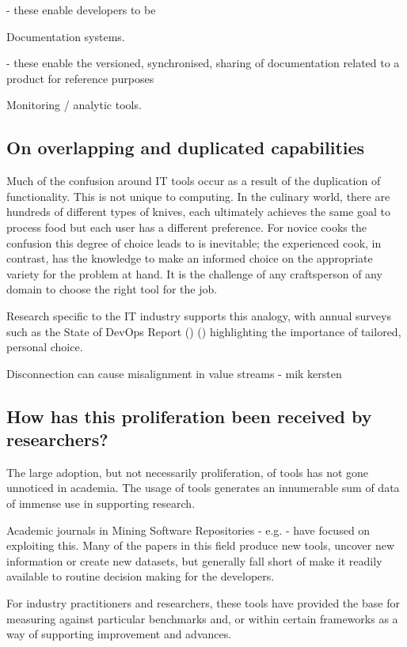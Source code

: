 - these enable developers to be 

Documentation systems.

- these enable the versioned, synchronised, sharing of documentation related to a product for reference purposes

Monitoring / analytic tools.

\subsection{On overlapping and duplicated capabilities}

Much of the confusion around IT tools occur as a result of the duplication of functionality. This is not unique to computing. In the culinary world, there are hundreds of different types of knives, each ultimately achieves the same goal to process food but each user has a different preference. For novice cooks the confusion this degree of choice leads to is inevitable; the experienced cook, in contrast, has the knowledge to make an informed choice on the appropriate variety for the problem at hand. It is the challenge of any craftsperson of any domain to choose the right tool for the job.


Research specific to the IT industry supports this analogy, with annual surveys such as the State of DevOps Report () ()  highlighting the importance of tailored, personal choice. 

Disconnection can cause misalignment in value streams - mik kersten

\subsection{How has this proliferation been received by researchers?}

The large adoption, but not necessarily proliferation, of tools has not gone unnoticed in academia. The usage of tools generates an innumerable sum of data of immense use in supporting research.

Academic journals in Mining Software Repositories - e.g. \cite{Storey:2019:3341883} - have focused on exploiting this. Many of the papers in this field produce new tools, uncover new information or create new datasets, but generally fall short of make it readily available to routine decision making for the developers.

For industry practitioners and researchers, these tools have provided the base for measuring against particular benchmarks and, or within certain frameworks as a way of supporting improvement and advances.


